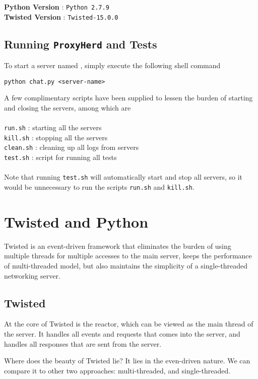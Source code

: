 \documentclass[letterpaper,twocolumn,10pt]{article}
\begin{document}
{\bf Python Version}  :  {\tt Python 2.7.9} \\
{\bf Twisted Version}  :  {\tt Twisted-15.0.0}

\subsection{Running {\tt ProxyHerd} and Tests}

To start a server named {\tt <server-name>}, simply execute the following shell command
\begin{center}
{\tt python chat.py <server-name>}
\end{center}

A few complimentary scripts have been supplied to lessen the burden of starting and closing the servers, among which are \\
\\
{\tt run.sh} : starting all the servers \\
{\tt kill.sh} : stopping all the servers \\
{\tt clean.sh} : cleaning up all logs from servers \\
{\tt test.sh} : script for running all tests \\
\\
Note that running {\tt test.sh} will automatically start and stop all servers, so it would be unnecessary to run the scripts {\tt run.sh} and {\tt kill.sh}.

\section{Twisted and Python}

Twisted is an event-driven framework that eliminates the burden of using multiple threads for multiple accesses to the main server, keeps the performance of multi-threaded model, but also maintains the simplicity of a single-threaded networking server.

\subsection{Twisted}

At the core of Twisted is the reactor, which can be viewed as the main thread of the server. It handles all events and requests that comes into the server, and handles all responses that are sent from the server.

Where does the beauty of Twisted lie? It lies in the even-driven nature. We can compare it to other two approaches: multi-threaded, and single-threaded.
\end{document}

